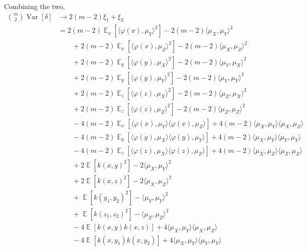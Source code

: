 \documentclass{article}
\DeclareMathOperator{\E}{\mathbb{E}}
\DeclareMathOperator{\Var}{Var}
\begin{document}
Combining the two,
\begin{align*}
    \binom{m}{2} \Var[\delta]
  &\to 2 (m-2) \xi_1 + \xi_2
\\&=
     2(m-2) \E_{x}\left[ \langle \varphi(x), \mu_Y \rangle^2 \right]
   - 2(m-2) \langle \mu_X, \mu_Y \rangle^2
\\&\qquad
   + 2(m-2) \E_{x}\left[ \langle \varphi(x), \mu_Z \rangle^2 \right]
   - 2(m-2) \langle \mu_X, \mu_Z \rangle^2
\\&\qquad
   + 2(m-2) \E_{y}\left[ \langle \varphi(y), \mu_X \rangle^2 \right]
   - 2(m-2) \langle \mu_Y, \mu_X \rangle^2
\\&\qquad
   + 2(m-2) \E_{y}\left[ \langle \varphi(y), \mu_Y  \rangle^2 \right]
   - 2(m-2) \langle \mu_Y, \mu_Y \rangle^2
\\&\qquad
   + 2(m-2) \E_{z}\left[ \langle \varphi(z), \mu_X \rangle^2 \right]
   - 2(m-2) \langle \mu_Z, \mu_X \rangle^2
\\&\qquad
   + 2(m-2) \E_{z}\left[ \langle \varphi(z), \mu_Z \rangle^2 \right]
   - 2(m-2) \langle \mu_Z, \mu_Z \rangle^2
\\&\qquad
   - 4(m-2) \E_x\left[ \langle \varphi(x), \mu_Y \rangle \langle \varphi(x), \mu_Z \rangle \right]
   + 4(m-2) \langle \mu_X, \mu_Y \rangle \langle \mu_X, \mu_Z \rangle
\\&\qquad
   - 4(m-2) \E_y\left[ \langle \varphi(y), \mu_X \rangle \langle \varphi(y), \mu_Y \rangle \right]
   + 4(m-2) \langle \mu_X, \mu_Y \rangle \langle \mu_Y, \mu_Y \rangle
\\&\qquad
   - 4(m-2) \E_z\left[ \langle \varphi(z), \mu_X \rangle \langle \varphi(z), \mu_Z \rangle \right]
   + 4(m-2) \langle \mu_X, \mu_Z \rangle \langle \mu_Z, \mu_Z \rangle
\\&\qquad
   + 2 \E\left[ k(x, y)^2 \right]
   - 2 \langle \mu_X, \mu_Y \rangle^2
\\&\qquad
   + 2 \E\left[ k(x, z)^2 \right]
   - 2 \langle \mu_X, \mu_Z \rangle^2
\\&\qquad
   + \E\left[ k(y_1, y_2)^2 \right]
   - \langle \mu_Y, \mu_Y \rangle^2
\\&\qquad
   + \E\left[ k(z_1, z_2)^2 \right]
   - \langle \mu_Z, \mu_Z \rangle^2
\\&\qquad
   - 4 \E\left[ k(x, y) k(x, z) \right]
   + 4 \langle \mu_X, \mu_Y \rangle \langle \mu_X, \mu_Z \rangle
\\&\qquad
   - 4 \E\left[ k(x, y_1) k(x, y_2) \right]
   + 4 \langle \mu_X, \mu_Y \rangle \langle \mu_Y, \mu_Y \rangle
\\&\qquad

\end{align*}
\end{document}
